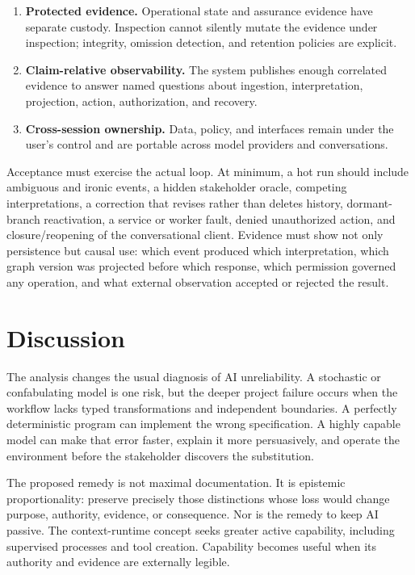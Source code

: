 \documentclass[10pt,a4paper]{article}
\begin{document}
\begin{enumerate}
  \item \textbf{Protected evidence.} Operational state and assurance evidence have separate custody. Inspection cannot silently mutate the evidence under inspection; integrity, omission detection, and retention policies are explicit.
  \item \textbf{Claim-relative observability.} The system publishes enough correlated evidence to answer named questions about ingestion, interpretation, projection, action, authorization, and recovery.
  \item \textbf{Cross-session ownership.} Data, policy, and interfaces remain under the user's control and are portable across model providers and conversations.
\end{enumerate}

Acceptance must exercise the actual loop. At minimum, a hot run should include ambiguous and ironic events, a hidden stakeholder oracle, competing interpretations, a correction that revises rather than deletes history, dormant-branch reactivation, a service or worker fault, denied unauthorized action, and closure/reopening of the conversational client. Evidence must show not only persistence but causal use: which event produced which interpretation, which graph version was projected before which response, which permission governed any operation, and what external observation accepted or rejected the result.

\section{Discussion}

The analysis changes the usual diagnosis of AI unreliability. A stochastic or confabulating model is one risk, but the deeper project failure occurs when the workflow lacks typed transformations and independent boundaries. A perfectly deterministic program can implement the wrong specification. A highly capable model can make that error faster, explain it more persuasively, and operate the environment before the stakeholder discovers the substitution.

The proposed remedy is not maximal documentation. It is epistemic proportionality: preserve precisely those distinctions whose loss would change purpose, authority, evidence, or consequence. Nor is the remedy to keep AI passive. The context-runtime concept seeks greater active capability, including supervised processes and tool creation. Capability becomes useful when its authority and evidence are externally legible.
\end{document}
